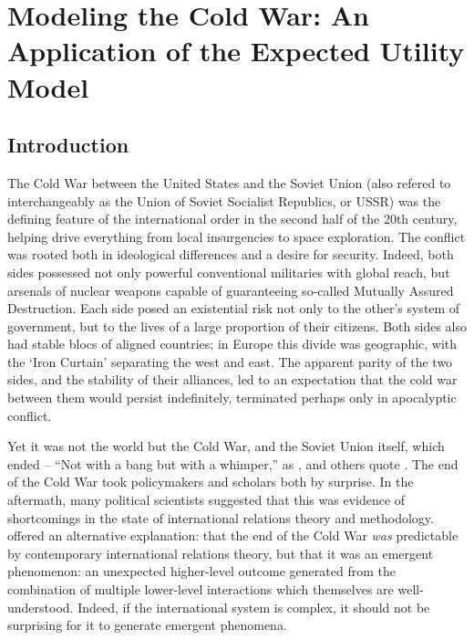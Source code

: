 \chapter[Modeling the Cold War]{Modeling the Cold War: An Application of the Expected Utility Model}

\section{Introduction}


The Cold War between the United States and the Soviet Union (also refered to interchangeably as the Union of Soviet Socialist Republics, or USSR) was the defining feature of the international order in the second half of the 20th century, helping drive everything from local insurgencies to space exploration. The conflict was rooted both in ideological differences and a desire for security. Indeed, both sides possessed not only powerful conventional militaries with global reach, but arsenals of nuclear weapons capable of guaranteeing so-called Mutually Assured Destruction. Each side posed an existential risk not only to the other's system of government, but to the lives of a large proportion of their citizens. Both sides also had stable blocs of aligned countries; in Europe this divide was geographic, with the `Iron Curtain' separating the west and east. The apparent parity of the two sides, and the stability of their alliances, led to an expectation that the cold war between them would persist indefinitely, terminated perhaps only in apocalyptic conflict. 

Yet it was not the world but the Cold War, and the Soviet Union itself, which ended -- ``Not with a bang but with a whimper,'' as \citet{dobson_2007}, \citet{prados_2011} and others quote \citet{eliot_1934}. The end of the Cold War took policymakers and scholars both by surprise. In the aftermath, many political scientists \citep[e.g.][]{gaddis_1992,lebow_1995} suggested that this was evidence of shortcomings in the state of international relations theory and methodology. \citet{bdm_1998} offered an alternative explanation: that the end of the Cold War \emph{was} predictable by contemporary international relations theory, but that it was an emergent phenomenon: an unexpected higher-level outcome generated from the combination of multiple lower-level interactions which themselves are well-understood. Indeed, if the international system is complex, it should not be surprising for it to generate emergent phenomena.

